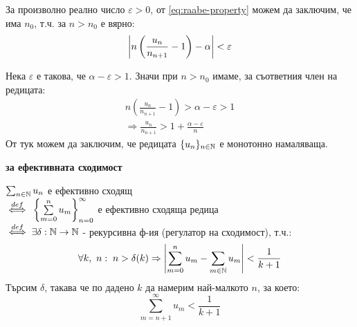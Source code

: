 \begin{solution}
    За произволно реално число $\varepsilon > 0$, от \eqref{eq:raabe-property} можем да заключим, че има $n_0$, т.ч. за $n > n_0$ е вярно:
    \begin{equation}
        \left|n\left(\frac{u_n}{n_{n+1}} - 1\right) - \alpha\right| < \varepsilon
    \end{equation}

    Нека $\varepsilon$ е такова, че $\alpha - \varepsilon > 1$.
    Значи при $n > n_0$ имаме, за съответния член на редицата:
    \begin{equation}
        \begin{split}
            n\left(\frac{u_n}{n_{n+1}} - 1\right) > \alpha - \varepsilon > 1 \\
            \Rightarrow \frac{u_n}{n_{n+1}} > 1 + \frac{\alpha - \varepsilon}{n}
        \end{split}
    \end{equation}
    От тук можем да заключим, че редицата $\{u_n\}_{n \in {\mathbb{N}}}$ е монотонно намаляваща.
    
    \textbf{за ефективната сходимост}

    $\sum_{n \in {\mathbb{N}}} u_n$ е ефективно сходящ \\
    ${\overset{def}{\iff}}\; \left\{\sum\limits_{m=0}^n u_m\right\}_{n=0}^\infty$ е ефективно сходяща редица \\
    ${\overset{def}{\iff}}\; \exists \delta: {\mathbb{N}} \to {\mathbb{N}}$ - рекурсивна ф-ия (регулатор на сходимост), т.ч.:
    \begin{equation}
        \forall k,\ n:\; n > \delta(k) \Rightarrow \left|\sum\limits_{m=0}^n u_m - \sum_{m \in {\mathbb{N}}} u_m\right| < \frac{1}{k+1}
    \end{equation}
    Търсим $\delta$, такава че по дадено $k$ да намерим най-малкото $n$, за което:
    \begin{equation}
        \sum_{m=n+1}^\infty u_m < \frac{1}{k+1}
    \end{equation} 
\end{solution}